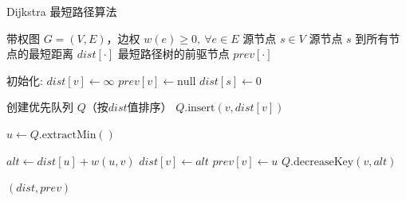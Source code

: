 \documentclass[12pt,a4paper]{article}
\begin{document}
\begin{algorithm}
\caption{Dijkstra 最短路径算法}
\label{alg:dijkstra}

\begin{algorithmic}[1]
\Require 
  \Statex 带权图 $G=(V,E)$，边权 $w(e) \geq 0,\ \forall e \in E$
  \Statex 源节点 $s \in V$
\Ensure
  \Statex 源节点 $s$ 到所有节点的最短距离 $dist[\cdot]$
  \Statex 最短路径树的前驱节点 $prev[\cdot]$

\State 初始化:
  \State $dist[v] \gets \infty$
  \State $prev[v] \gets \text{null}$
\EndFor
\State $dist[s] \gets 0$

\State 创建优先队列 $Q$（按$dist$值排序）
  \State $Q.\text{insert}(v, dist[v])$
\EndFor

  \State $u \gets Q.\text{extractMin}()$ 
  
    \State $alt \gets dist[u] + w(u,v)$ 
      \State $dist[v] \gets alt$
      \State $prev[v] \gets u$
      \State $Q.\text{decreaseKey}(v, alt)$ 
    \EndIf
  \EndFor
\EndWhile

\State \Return $(dist, prev)$
\end{algorithmic}
\end{algorithm}
\end{document}
